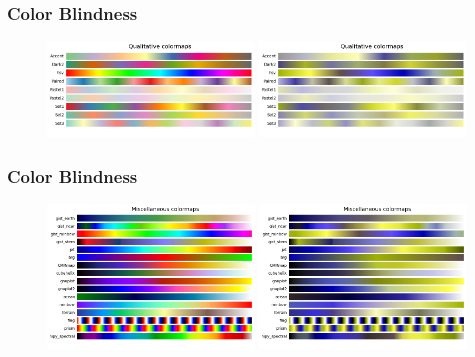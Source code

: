 \documentclass[ignorenonframetext]{beamer}
\begin{document}
\begin{frame}[t]\frametitle{Color Blindness}
    \begin{figure}[htbp]
        \includegraphics[width=0.49\textwidth]{figures/Qualitative}
        \includegraphics[width=0.49\textwidth]{figures/QualitativeDeuteranopia}
    \end{figure}
\end{frame}
\begin{frame}[t]\frametitle{Color Blindness}
    \begin{figure}[htbp]
        \centering
        \includegraphics[width=0.49\textwidth]{figures/Miscellaneous}
        \includegraphics[width=0.49\textwidth]{figures/MiscellaneousDeuteranopia}
    \end{figure}
\end{frame}
\end{document}
